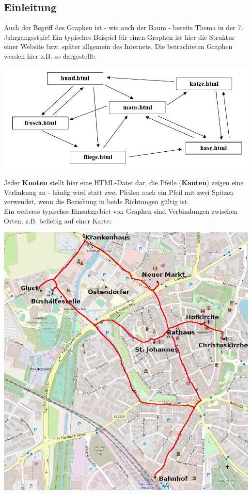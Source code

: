 \documentclass{article}
\begin{document}
\subsection{Einleitung}
Auch der Begriff des Graphen ist - wie auch der Baum - bereits Thema in der 7. Jahrgangsstufe! Ein typisches Beispiel für einen Graphen ist hier die Struktur einer Website bzw. später allgemein des Internets. Die betrachteten Graphen werden hier z.B. so dargestellt: 
\begin{center}
    \includegraphics[scale=0.5]{../../media/website.png}
\end{center}
Jeder \textbf{Knoten} stellt hier eine HTML-Datei dar, die Pfeile (\textbf{Kanten}) zeigen eine Verlinkung an - häufig wird statt zwei Pfeilen auch ein Pfeil mit zwei Spitzen verwendet, wenn die Beziehung in beide Richtungen gültig ist. \\
Ein weiteres typisches Einsatzgebiet von Graphen sind Verbindungen zwischen Orten, z.B. beliebig auf einer Karte:
\begin{center}
    \includegraphics[scale=0.45]{../../media/neumarkt.png}
\end{center}
\end{document}
